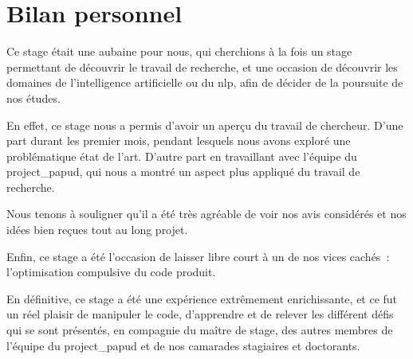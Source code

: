 \section{Bilan personnel}
Ce stage était une aubaine pour nous, qui cherchions à la fois un stage permettant de découvrir le travail de recherche, et une occasion de découvrir les domaines de l'intelligence artificielle ou du \gls{nlp}, afin de décider de la poursuite de nos études.

En effet, ce stage nous a permis d'avoir un aperçu du travail de chercheur. D'une part durant les premier mois, pendant lesquels nous avons exploré une problématique état de l'art. D'autre part en travaillant avec l'équipe du \gls{project_papud}, qui nous a montré un aspect plus appliqué du travail de recherche.

Nous tenons à souligner qu'il a été très agréable de voir nos avis considérés et nos idées bien reçues tout au long projet.

Enfin, ce stage a été l'occasion de laisser libre court à un de nos vices cachés~: l'optimisation compulsive du code produit.

En définitive, ce stage a été une expérience extrêmement enrichissante, et ce fut un réel plaisir de manipuler le code, d'apprendre et de relever les différent défis qui se sont présentés, en compagnie du maître de stage, des autres membres de l'équipe du \gls{project_papud} et de nos camarades stagiaires et doctorants.









